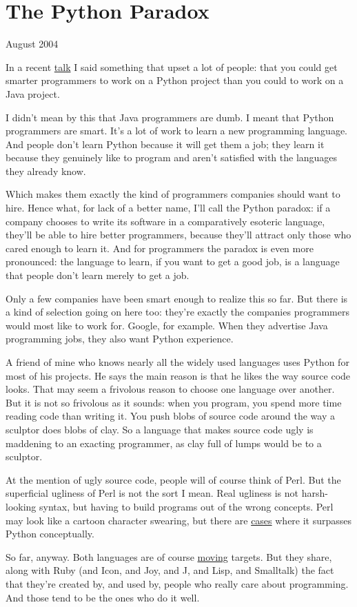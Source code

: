 \chapter{The Python Paradox}

August 2004

In a recent \href{gh.html}{talk} I said something that upset a lot of
people: that you could get smarter programmers to work on a Python
project than you could to work on a Java project.

I didn't mean by this that Java programmers are dumb. I meant that
Python programmers are smart. It's a lot of work to learn a new
programming language. And people don't learn Python because it will get
them a job; they learn it because they genuinely like to program and
aren't satisfied with the languages they already know.

Which makes them exactly the kind of programmers companies should want
to hire. Hence what, for lack of a better name, I'll call the Python
paradox: if a company chooses to write its software in a comparatively
esoteric language, they'll be able to hire better programmers, because
they'll attract only those who cared enough to learn it. And for
programmers the paradox is even more pronounced: the language to learn,
if you want to get a good job, is a language that people don't learn
merely to get a job.

Only a few companies have been smart enough to realize this so far. But
there is a kind of selection going on here too: they're exactly the
companies programmers would most like to work for. Google, for example.
When they advertise Java programming jobs, they also want Python
experience.

A friend of mine who knows nearly all the widely used languages uses
Python for most of his projects. He says the main reason is that he
likes the way source code looks. That may seem a frivolous reason to
choose one language over another. But it is not so frivolous as it
sounds: when you program, you spend more time reading code than writing
it. You push blobs of source code around the way a sculptor does blobs
of clay. So a language that makes source code ugly is maddening to an
exacting programmer, as clay full of lumps would be to a sculptor.

At the mention of ugly source code, people will of course think of Perl.
But the superficial ugliness of Perl is not the sort I mean. Real
ugliness is not harsh-looking syntax, but having to build programs out
of the wrong concepts. Perl may look like a cartoon character swearing,
but there are \href{icad.html}{cases} where it surpasses Python
conceptually.

So far, anyway. Both languages are of course \href{hundred.html}{moving}
targets. But they share, along with Ruby (and Icon, and Joy, and J, and
Lisp, and Smalltalk) the fact that they're created by, and used by,
people who really care about programming. And those tend to be the ones
who do it well.